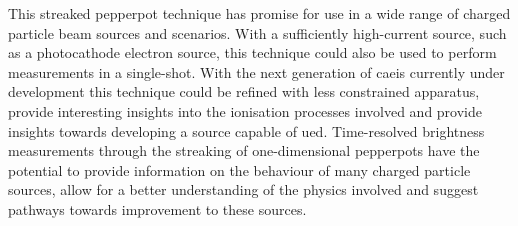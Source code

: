 This streaked pepperpot technique has promise for use in a wide range of charged particle beam sources and scenarios.
With a sufficiently high-current source, such as a photocathode electron source, this technique could also be used to perform measurements in a single-shot.
With the next generation of \gls{caeis} currently under development this technique could be refined with less constrained apparatus, provide interesting insights into the ionisation processes involved and provide insights towards developing a source capable of \gls{ued}.
Time-resolved brightness measurements through the streaking of one-dimensional pepperpots have the potential to provide information on the behaviour of many charged particle sources, allow for a better understanding of the physics involved and suggest pathways towards improvement to these sources.
